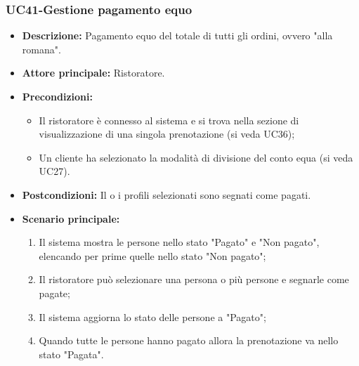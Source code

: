 \subsubsection{UC41-Gestione pagamento equo}
\begin{itemize}
    \item \textbf{Descrizione:} Pagamento equo del totale di tutti gli ordini, ovvero "alla romana".
    \item \textbf{Attore principale:} Ristoratore.
    \item \textbf{Precondizioni:}
    \begin{itemize}
        \item Il ristoratore è connesso al sistema e si trova nella sezione di visualizzazione di una singola prenotazione (si veda UC36);
        \item Un cliente ha selezionato la modalità di divisione del conto equa (si veda UC27).
    \end{itemize}
    \item \textbf{Postcondizioni:} Il o i profili selezionati sono segnati come pagati.
    \item \textbf{Scenario principale:}
    \begin{enumerate}
        \item Il sistema mostra le persone nello stato "Pagato" e "Non pagato", elencando per prime quelle nello stato "Non pagato";
        \item Il ristoratore può selezionare una persona o più persone e segnarle come pagate;
        \item Il sistema aggiorna lo stato delle persone a "Pagato";
        \item Quando tutte le persone hanno pagato allora la prenotazione va nello stato "Pagata".
    \end{enumerate}
\end{itemize}

